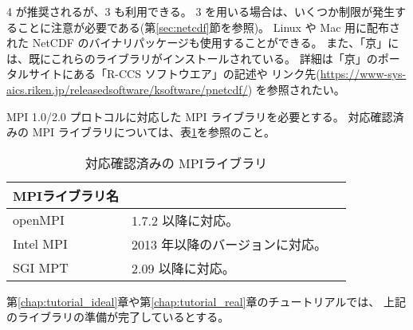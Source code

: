 {\netcdf}4 が推奨されるが、{\netcdf}3 も利用できる。
{\netcdf}3 を用いる場合は、いくつか制限が発生することに注意が必要である(第\ref{sec:netcdf}節を参照)。
Linux や Mac 用に配布された NetCDF のバイナリパッケージも使用することができる。
また、「京」には、既にこれらの{\netcdf}ライブラリがインストールされている。
詳細は「京」のポータルサイトにある「R-CCS ソフトウエア」の記述や
リンク先(\url{https://www-sys-aics.riken.jp/releasedsoftware/ksoftware/pnetcdf/})
を参照されたい。

MPI 1.0/2.0 プロトコルに対応した MPI ライブラリを必要とする。
対応確認済みの MPI ライブラリについては、表\ref{tab:compatible_mpi}を参照のこと。

\begin{table}[htb]
\begin{center}
\caption{対応確認済みの MPIライブラリ}
\begin{tabularx}{150mm}{|l|X|X|} \hline
 \rowcolor[gray]{0.9} MPIライブラリ名 & \\ \hline
 openMPI   & 1.7.2 以降に対応。 \\ \hline
 Intel MPI & 2013 年以降のバージョンに対応。 \\ \hline
 SGI MPT   & 2.09 以降に対応。 \\ \hline
\end{tabularx}
\label{tab:compatible_mpi}
\end{center}
\end{table}


第\ref{chap:tutorial_ideal}章や第\ref{chap:tutorial_real}章のチュートリアルでは、
上記のライブラリの準備が完了しているとする。


